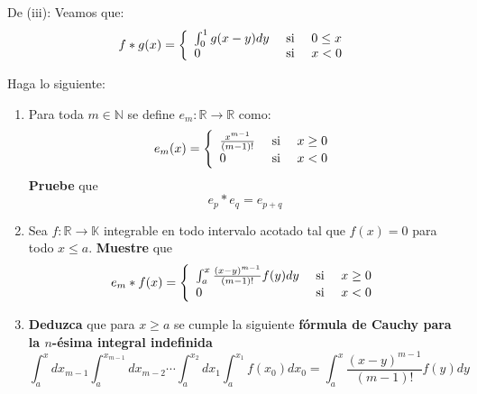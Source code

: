 \documentclass[12pt]{report}
\theoremstyle{largebreak}
\newcommand\cf[3]{\ensuremath{#1:#2\rightarrow#3}}
\begin{document}
\begin{sol}
        De (iii): Veamos que:
        \begin{equation*}
            f*g(x)=\left\{
                \begin{array}{lcr}
                    \int_0^1g(x-y)dy & \textup{ si } & 0\leq x \\
                    0 & \textup{ si } & x<0\\ 
                \end{array}
            \right.
        \end{equation*}
    \end{sol}
    
    \begin{excer}
        Haga lo siguiente:
        \begin{enumerate}
            \item Para toda $m\in\mathbb{N}$ se define $\cf{e_m}{\mathbb{R}}{\mathbb{R}}$ como:
            \begin{equation*}
                e_m(x)=\left\{
                    \begin{array}{lcr}
                        \frac{x^{m-1}}{(m-1)!} & \textup{ si } & x\geq 0 \\
                        0 & \textup{ si }&x<0\\
                    \end{array}
                \right.
            \end{equation*}
            \textbf{Pruebe} que
            \begin{equation*}
                e_p*e_q=e_{p+q}
            \end{equation*}
            \item Sea $\cf{f}{\mathbb{R}}{\mathbb{K}}$ integrable en todo intervalo acotado tal que $f(x)=0$ para todo $x\leq a$. \textbf{Muestre} que
            \begin{equation*}
                e_m*f(x)=\left\{
                    \begin{array}{lcr}
                        \int_{a}^x\frac{(x-y)^{m-1}}{(m-1)!}f(y)dy & \textup{ si } & x\geq 0 \\
                        0 & \textup{ si }&x<0\\
                    \end{array}
                \right.
            \end{equation*}
            \item \textbf{Deduzca} que para $x\geq a$ se cumple la siguiente \textbf{fórmula de Cauchy para la $n$-ésima integral indefinida}
            \begin{equation*}
                \int_{a}^xdx_{ m-1}\int_a^{ x_{m-1}}dx_{m-2}\cdots\int_{a}^{x_{2}} dx_{1}\int_a^{ x_1}f(x_0)dx_0=\int_a^x\frac{(x-y)^{m-1}}{(m-1)!}f(y)dy
            \end{equation*}
        \end{enumerate}
    \end{excer}
\end{document}
